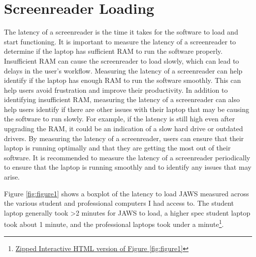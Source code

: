 \pagebreak \hypertarget{screenreader-loading}{}\section{Screenreader Loading}\label{screenreader-loading}
The latency of a screenreader is the time it takes for the software to load and start functioning. It is important to measure the latency of a screenreader to determine if the laptop has sufficient RAM to run the software properly. Insufficient RAM can cause the screenreader to load slowly, which can lead to delays in the user’s workflow. Measuring the latency of a screenreader can help identify if the laptop has enough RAM to run the software smoothly. This can help users avoid frustration and improve their productivity. In addition to identifying insufficient RAM, measuring the latency of a screenreader can also help users identify if there are other issues with their laptop that may be causing the software to run slowly. For example, if the latency is still high even after upgrading the RAM, it could be an indication of a slow hard drive or outdated drivers. By measuring the latency of a screenreader, users can ensure that their laptop is running optimally and that they are getting the most out of their software. It is recommended to measure the latency of a screenreader periodically to ensure that the laptop is running smoothly and to identify any issues that may arise.

Figure \ref{fig:figure1} shows a boxplot of the latency to load JAWS measured across the various student and professional computers I had access to. The student laptop generally took \textgreater2 minutes for JAWS to load, a higher spec student laptop took about 1 minute, and the professional laptops took under a minute\footnote{\raggedright \href{http://github.com/mrhunsaker/MiscResources/raw/main/ComputerRBDisplaySpecsTVIFig1.zip}{Zipped Interactive HTML version of Figure \ref{fig:figure1}}}.

